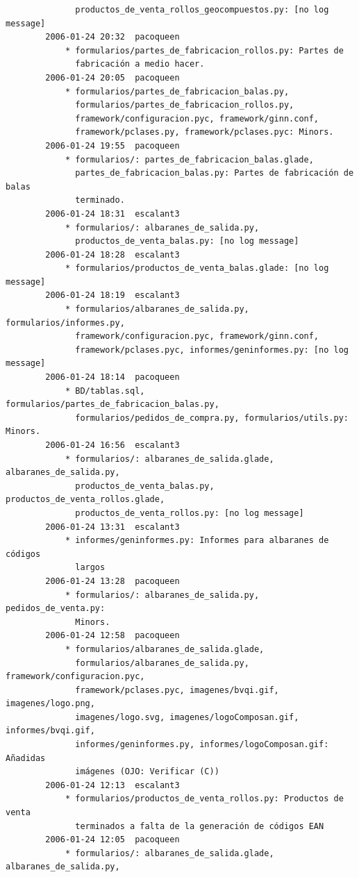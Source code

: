 \documentclass[a4paper]{article}
\begin{document}
\begin{verbatim}
              productos_de_venta_rollos_geocompuestos.py: [no log message]
        2006-01-24 20:32  pacoqueen
            * formularios/partes_de_fabricacion_rollos.py: Partes de
              fabricación a medio hacer.
        2006-01-24 20:05  pacoqueen
            * formularios/partes_de_fabricacion_balas.py,
              formularios/partes_de_fabricacion_rollos.py,
              framework/configuracion.pyc, framework/ginn.conf,
              framework/pclases.py, framework/pclases.pyc: Minors.
        2006-01-24 19:55  pacoqueen
            * formularios/: partes_de_fabricacion_balas.glade,
              partes_de_fabricacion_balas.py: Partes de fabricación de balas
              terminado.
        2006-01-24 18:31  escalant3
            * formularios/: albaranes_de_salida.py,
              productos_de_venta_balas.py: [no log message]
        2006-01-24 18:28  escalant3
            * formularios/productos_de_venta_balas.glade: [no log message]
        2006-01-24 18:19  escalant3
            * formularios/albaranes_de_salida.py, formularios/informes.py,
              framework/configuracion.pyc, framework/ginn.conf,
              framework/pclases.pyc, informes/geninformes.py: [no log message]
        2006-01-24 18:14  pacoqueen
            * BD/tablas.sql, formularios/partes_de_fabricacion_balas.py,
              formularios/pedidos_de_compra.py, formularios/utils.py: Minors.
        2006-01-24 16:56  escalant3
            * formularios/: albaranes_de_salida.glade, albaranes_de_salida.py,
              productos_de_venta_balas.py, productos_de_venta_rollos.glade,
              productos_de_venta_rollos.py: [no log message]
        2006-01-24 13:31  escalant3
            * informes/geninformes.py: Informes para albaranes de códigos
              largos
        2006-01-24 13:28  pacoqueen
            * formularios/: albaranes_de_salida.py, pedidos_de_venta.py:
              Minors.
        2006-01-24 12:58  pacoqueen
            * formularios/albaranes_de_salida.glade,
              formularios/albaranes_de_salida.py, framework/configuracion.pyc,
              framework/pclases.pyc, imagenes/bvqi.gif, imagenes/logo.png,
              imagenes/logo.svg, imagenes/logoComposan.gif, informes/bvqi.gif,
              informes/geninformes.py, informes/logoComposan.gif: Añadidas
              imágenes (OJO: Verificar (C))
        2006-01-24 12:13  escalant3
            * formularios/productos_de_venta_rollos.py: Productos de venta
              terminados a falta de la generación de códigos EAN
        2006-01-24 12:05  pacoqueen
            * formularios/: albaranes_de_salida.glade, albaranes_de_salida.py,

\end{verbatim}
\end{document}
